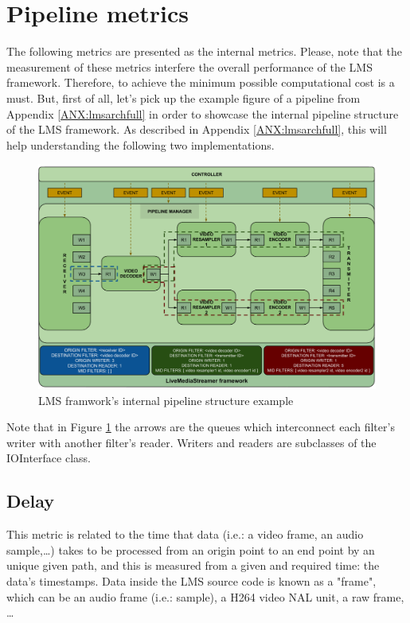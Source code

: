 \section{Pipeline metrics}

The following metrics are presented as the internal metrics. Please, note that the measurement of these metrics interfere the overall performance of the LMS framework. Therefore, to achieve the minimum possible computational cost is a must. But, first of all, let's pick up the example figure of a pipeline from Appendix \ref{ANX:lmsarchfull} in order to showcase the internal pipeline structure of the LMS framework. As described in Appendix \ref{ANX:lmsarchfull}, this will help understanding the following two implementations.

\begin{figure}[!htb]
\begin{center}
\includegraphics[width=1\textwidth]{./images/LMSpipelineBasicOne.png}
\caption{LMS framwork's internal pipeline structure example}
\label{F:lmsps}
\end{center}
\end{figure}

Note that in Figure \ref{F:lmsps} the arrows are the queues which interconnect each filter's writer with another filter's reader. Writers and readers are subclasses of the IOInterface class.

\subsection{Delay}

This metric is related to the time that data (i.e.: a video frame, an audio sample,\ldots) takes to be processed from an origin point to an end point by an unique given path, and this is measured from a given and required time: the data's timestamps. Data inside the LMS source code is known as a "frame", which can be an audio frame (i.e.: sample), a H264 video NAL unit, a raw frame, \ldots 

